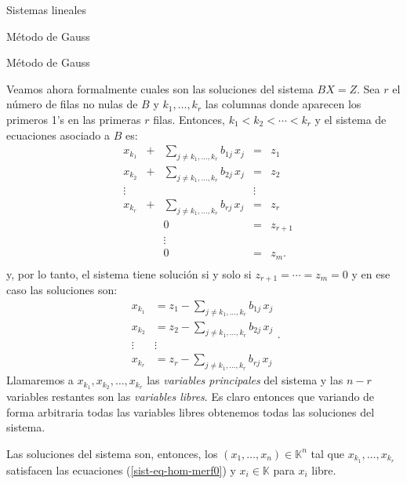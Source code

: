 \documentclass[a4paper,12pt,twoside,spanish,reqno]{amsbook}
\theoremstyle{definition}
\theoremstyle{remark}
\newcommand{\K}{\mathbb K}
\begin{document}
\begin{chapter}{Sistemas lineales}
\begin{section}{Método de Gauss }
\begin{subsection}{Método de Gauss}
                
                 Veamos ahora formalmente cuales son las soluciones del sistema $BX=Z$. Sea $r$ el número de filas no nulas de $B$ y $k_1,\ldots, k_r$ las columnas donde aparecen los primeros 1's en las primeras $r$ filas. Entonces, $k_1 < k_2 < \cdots< k_r$ y el sistema de ecuaciones asociado a $B$ es:
                \begin{equation}
                \begin{matrix}
                &x_{k_1}& + &\sum_{j \not= k_1,\ldots, k_r} b_{1j}\,x_j&= &z_1\\
                &x_{k_2}& + &\sum_{j \not= k_1,\ldots, k_r} b_{2j}\,x_j&= &z_2\\
                & \vdots& &  &\vdots \\
                &x_{k_r}& + &\sum_{j \not= k_1,\ldots, k_r} b_{rj}\,x_j&= &z_r\\
                &&  &0&= &z_{r+1}\\
                &&  &\vdots &\\
                &&  &0&= &z_{m}.\\
                \end{matrix}
                \end{equation}  
                y, por lo tanto, el sistema tiene solución si y solo si  $z_{r+1} = \cdots = z_m =0$ y en ese caso las soluciones son: 
                \begin{equation}
                \begin{matrix}\label{sist-eq-hom-merf0}
                x_{k_1} &= z_1-\sum_{j \not= k_1,\ldots, k_r} b_{1j}\,x_j\\
                x_{k_2} &= z_2-\sum_{j \not= k_1,\ldots, k_r} b_{2j}\,x_j\\
                \vdots& \vdots \\
                x_{k_r}  &= z_r-\textstyle\sum_{j \not= k_1,\ldots, k_r} b_{rj}\,x_j
                \end{matrix}.
                \end{equation} 
                Llamaremos a  $x_{k_1}, x_{k_2}, \ldots, x_{k_r}$ las \textit{variables principales} del sistema  y  las $n-r$ variables restantes son las \textit{variables libres}. Es claro entonces que variando de forma arbitraria todas las variables libres obtenemos todas las soluciones del sistema.
                
                 Las soluciones del sistema son, entonces,  los $(x_1,\ldots,x_n)\in \K^n$ tal que $x_{k_1},\ldots,x_{k_r}$ satisfacen las ecuaciones (\ref{sist-eq-hom-merf0}) y $x_i \in \K$ para $x_i$ libre. 
                

\end{subsection}
\end{section}
\end{chapter}
\end{document}
